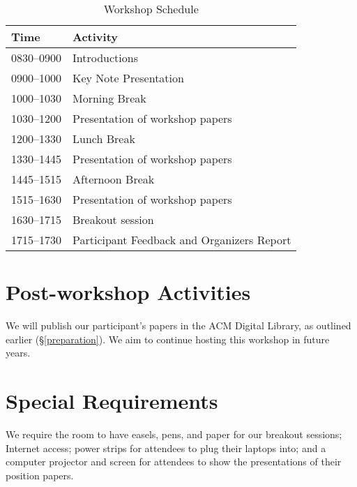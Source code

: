 \documentclass{sigplanconf}
\begin{document}
\begin{table} [!htbp] %
\begin{tabularx}{\columnwidth}{l|X}
\textbf{Time}   & \textbf{Activity} \\
\hline
0830--0900    & Introductions \vspace{1mm} \\
0900--1000    & Key Note Presentation \vspace{1mm} \\
1000--1030     & Morning Break~\vspace{1mm}\\
1030--1200   & Presentation of workshop papers \vspace{1mm}\\
1200--1330     & Lunch Break~\vspace{1mm}\\
1330--1445   & Presentation of workshop papers \vspace{1mm}\\
1445--1515    & Afternoon Break~\vspace{1mm}\\
1515--1630    & Presentation of workshop papers \vspace{1mm}\\
1630--1715    & Breakout session \vspace{1mm}\\
1715--1730    & Participant Feedback and Organizers Report  \\
\end{tabularx}
\caption{Workshop Schedule}
\label{tab:schedule}
\end{table}

\section{Post-workshop Activities}

We will publish our participant's papers in the ACM Digital Library, as outlined earlier (\S \ref{preparation}). We aim to continue hosting this workshop in future years.

\section{Special Requirements}

We require the room to have easels, pens, and paper for our breakout sessions; 
Internet access; power strips for attendees to plug their laptops into; and a computer projector and
screen for attendees to show the presentations of their position
papers.
\end{document}
